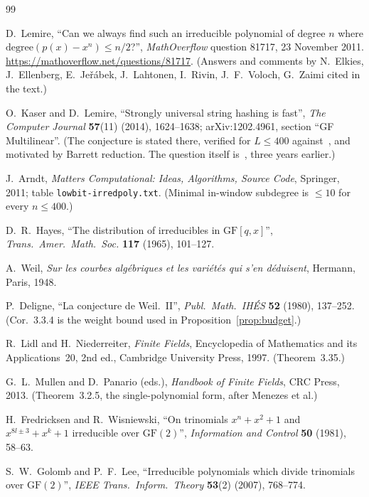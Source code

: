 \documentclass[10pt]{article}
\theoremstyle{plain}
\theoremstyle{definition}
\begin{document}
\begin{thebibliography}{99}
\footnotesize
\setlength{\itemsep}{1pt}

D.~Lemire, ``Can we always find such an irreducible polynomial of degree $n$
where $\mathrm{degree}(p(x)-x^n)\le n/2$?'', \emph{MathOverflow} question
81717, 23 November 2011.
\url{https://mathoverflow.net/questions/81717}. (Answers and comments by
N.~Elkies, J.~Ellenberg, E.~Je\v{r}\'abek, J.~Lahtonen, I.~Rivin, J.~F.~Voloch,
G.~Zaimi cited in the text.)

O.~Kaser and D.~Lemire, ``Strongly universal string hashing is fast'',
\emph{The Computer Journal} \textbf{57}(11) (2014), 1624--1638;
arXiv:1202.4961, section ``GF Multilinear''. (The conjecture is stated there,
verified for $L\le400$ against~\cite{Arndt}, and motivated by Barrett
reduction. The question itself is~\cite{MO81717}, three years earlier.)

J.~Arndt, \emph{Matters Computational: Ideas, Algorithms, Source Code},
Springer, 2011; table \texttt{lowbit-irredpoly.txt}. (Minimal in-window
subdegree is $\le10$ for every $n\le400$.)

D.~R.~Hayes, ``The distribution of irreducibles in $\mathrm{GF}[q,x]$'',
\emph{Trans.\ Amer.\ Math.\ Soc.} \textbf{117} (1965), 101--127.

A.~Weil, \emph{Sur les courbes alg\'ebriques et les vari\'et\'es qui s'en
d\'eduisent}, Hermann, Paris, 1948.

P.~Deligne, ``La conjecture de Weil.~II'', \emph{Publ.\ Math.\ IH\'ES}
\textbf{52} (1980), 137--252. (Cor.~3.3.4 is the weight bound used in
Proposition~\ref{prop:budget}.)

R.~Lidl and H.~Niederreiter, \emph{Finite Fields}, Encyclopedia of Mathematics
and its Applications~20, 2nd ed., Cambridge University Press, 1997.
(Theorem~3.35.)

G.~L.~Mullen and D.~Panario (eds.), \emph{Handbook of Finite Fields}, CRC
Press, 2013. (Theorem~3.2.5, the single-polynomial form, after Menezes et al.)

H.~Fredricksen and R.~Wisniewski, ``On trinomials $x^n+x^2+1$ and
$x^{8l\pm3}+x^k+1$ irreducible over $\mathrm{GF}(2)$'', \emph{Information and
Control} \textbf{50} (1981), 58--63.

S.~W.~Golomb and P.~F.~Lee, ``Irreducible polynomials which divide trinomials
over $\mathrm{GF}(2)$'', \emph{IEEE Trans.\ Inform.\ Theory} \textbf{53}(2)
(2007), 768--774.


\end{thebibliography}
\end{document}
